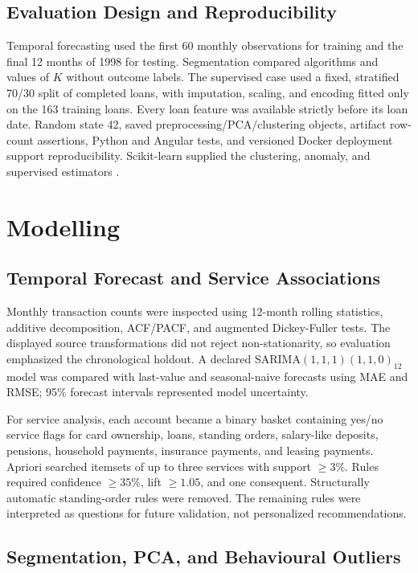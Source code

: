 \documentclass[conference]{IEEEtran}
\begin{document}
\subsection{Evaluation Design and Reproducibility}

Temporal forecasting used the first 60 monthly observations for training and the final 12 months of 1998 for testing. Segmentation compared algorithms and values of $K$ without outcome labels. The supervised case used a fixed, stratified 70/30 split of completed loans, with imputation, scaling, and encoding fitted only on the 163 training loans. Every loan feature was available strictly before its loan date. Random state 42, saved preprocessing/PCA/clustering objects, artifact row-count assertions, Python and Angular tests, and versioned Docker deployment support reproducibility. Scikit-learn supplied the clustering, anomaly, and supervised estimators \cite{pedregosa2011}.

\section{Modelling}

\subsection{Temporal Forecast and Service Associations}

Monthly transaction counts were inspected using 12-month rolling statistics, additive decomposition, ACF/PACF, and augmented Dickey-Fuller tests. The displayed source transformations did not reject non-stationarity, so evaluation emphasized the chronological holdout. A declared SARIMA$(1,1,1)(1,1,0)_{12}$ model was compared with last-value and seasonal-naive forecasts using MAE and RMSE; 95\% forecast intervals represented model uncertainty.

For service analysis, each account became a binary basket containing yes/no service flags for card ownership, loans, standing orders, salary-like deposits, pensions, household payments, insurance payments, and leasing payments. Apriori searched itemsets of up to three services with support $\geq3\%$. Rules required confidence $\geq35\%$, lift $\geq1.05$, and one consequent. Structurally automatic standing-order rules were removed. The remaining rules were interpreted as questions for future validation, not personalized recommendations.

\subsection{Segmentation, PCA, and Behavioural Outliers}
\end{document}
